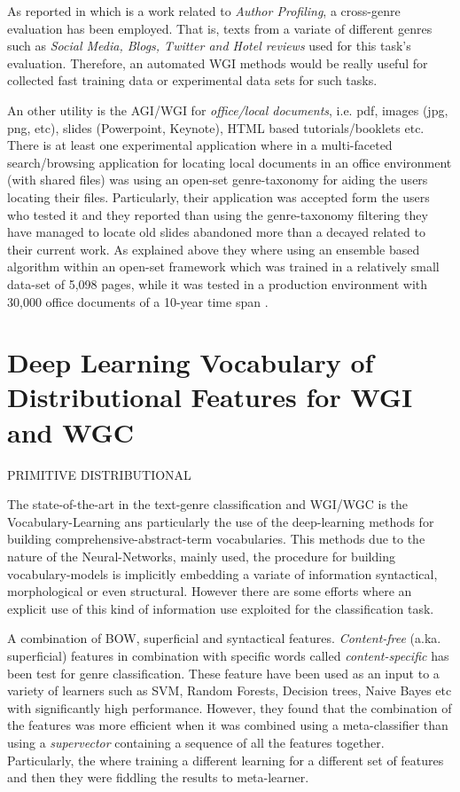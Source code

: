 As reported in \parencite{rangel2016overview} which is a work related to \textit{Author Profiling}, a cross-genre evaluation has been employed. That is, texts from a variate of different genres such as \textit{Social Media, Blogs, Twitter and Hotel reviews} used for this task's evaluation. Therefore, an automated WGI methods would be really useful for collected fast training data or experimental data sets for such tasks.

An other utility is the AGI/WGI for \textit{office/local documents}, i.e. pdf, images (jpg, png, etc), slides (Powerpoint, Keynote), HTML based tutorials/booklets etc. There is at least one experimental application where in a multi-faceted search/browsing application for locating local documents in an office environment (with shared files) was using an open-set  genre-taxonomy for aiding the users locating their files. Particularly, their application was accepted form the users who tested it and they reported than using the genre-taxonomy filtering they have managed to locate old slides abandoned more than a decayed related to their current work. As explained above they where using an ensemble based algorithm within an open-set framework which was trained in a relatively small data-set of 5,098 pages, while it was tested in a production environment with 30,000 office documents of a 10-year time span \parencite{chen2012genre}. 


\section{Deep Learning Vocabulary of Distributional Features for WGI and WGC}\label{chap:relevant_work:sec:intro}


PRIMITIVE DISTRIBUTIONAL \parencite{kim2010formulating} 


The state-of-the-art in the text-genre classification and WGI/WGC is the Vocabulary-Learning ans particularly the use of the deep-learning methods for building comprehensive-abstract-term vocabularies. This methods due to the nature of the Neural-Networks, mainly used,  the procedure for building vocabulary-models is implicitly embedding a variate of information syntactical, morphological or even structural. However there are some efforts where an explicit use of this kind of information use exploited for the classification task. 

A combination of BOW, superficial and syntactical features. \textit{Content-free} (a.ka. superficial) features in combination with specific words called \textit{content-specific} has been test for genre classification. These feature have been used as an input to a variety of learners such as SVM, Random Forests, Decision trees, Naive Bayes etc with significantly high performance. However, they found that the combination of the features was more efficient when it was combined using a meta-classifier than using a \textit{supervector} containing a sequence of all the features together. Particularly, the where training a different learning for a different set of features and then they were fiddling the results to meta-learner\parencite{lee2017text}.

